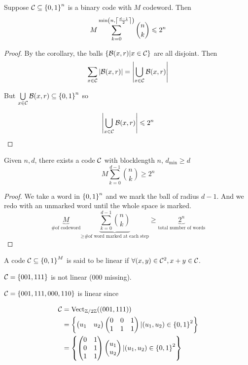 \begin{theorem}
    Suppose $\mathcal{C} \subseteq \left\{ 0,1 \right\}^n$ is a binary code with $M$ codeword. Then
    \[
        M \sum\limits_{k=0}^{\min\left(n,\left\lceil \frac{d-1}{2} \right\rceil\right)}\binom{n}{k} \leqslant 2^n
    \]
\end{theorem}
\begin{proof}
    By the corollary, the balls $\left\{ \mathcal{B}(x,r)\vert x \in \mathcal{C} \right\}$ are all disjoint. Then
    \[
        \sum\limits_{x\in \mathcal{C}}\left\lvert\mathcal{B}(x,r)\right\rvert = \left\lvert\bigcup\limits_{x \in \mathcal{C}} \mathcal{B}(x,r)\right\rvert
    \]

    But $\bigcup\limits_{x \in \mathcal{C}} \mathcal{B}(x,r) \subseteq \left\{ 0,1 \right\}^n$ so
    
    \[
        \left\lvert\bigcup\limits_{x \in \mathcal{C}} \mathcal{B}(x,r)\right\rvert \leqslant 2^n
    \]
\end{proof}


\begin{theorem}
    Given $n, d$, there exists a code $\mathcal{C}$ with blocklength $n$, $d_{\min} \geqslant d$
    \[
        M \sum\limits_{k=0}^{d-1} \binom{n}{k} \geqslant 2^n
    \]
\end{theorem}
\begin{proof}
    We take a word in $\left\{ 0,1 \right\}^n$ and we mark the ball of radius $d-1$. And we redo with an unmarked word until the whole space is marked.
    \[
        \underbrace{M}_{\text{\# of codeword}} \underbrace{\sum\limits_{k=0}^{d-1} \binom{n}{k}}_{\geqslant \text{\# of word marked at each step}} \geqslant \underbrace{2^n}_{\text{total number of words}}
    \]
\end{proof}

\begin{definition}
    A code $\mathcal{C}\subseteq\left\{ 0,1 \right\}^M$ is said to be linear if $\forall (x,y)\in\mathcal{C}^2, x+y\in\mathcal{C}$.
\end{definition}

\begin{example}
    $\mathcal{C} = \left\{ 001,111 \right\}$ is not linear ($000$ missing).
    
    $\mathcal{C} = \left\{ 001,111,000,110 \right\}$ is linear since 
    
    \[
        \begin{aligned}
            \mathcal{C}&=\operatorname{Vect}_{\mathbb{Z}/2\mathbb{Z}}((001,111))\\
            &= \left\{ \left(\begin{matrix}u_1&u_2\end{matrix}\right)\left(\begin{matrix}0&0&1\\1&1&1\end{matrix}\right)\vert (u_1,u_2)\in\left\{ 0,1 \right\}^2 \right\}\\
            &= \left\{ \left(\begin{matrix}0&1\\0&1\\1&1\end{matrix}\right)\left(\begin{matrix}u_1\\u_2\end{matrix}\right)\vert (u_1,u_2)\in\left\{ 0,1 \right\}^2 \right\}
        \end{aligned}
    \]
\end{example}

